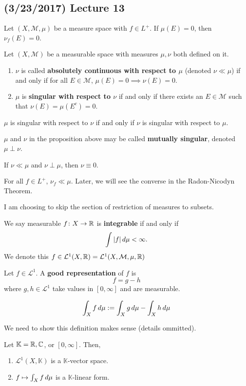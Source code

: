 \documentclass[11pt,leqno,oneside]{amsbook}
\numberwithin{thm}{section}
\newcommand{\M}{\mathcal{M}} %
\newcommand{\cL}{\mathcal{L}}
\renewcommand{\de}{\textbf} %
\begin{document}
\subsection*{(3/23/2017) Lecture 13}
\begin{prop}
  Let \((X,\M,\mu)\) be a measure space with \(f \in L^+\). If
  \(\mu(E) = 0\), then \(\nu_f(E) = 0\).
\end{prop}
\begin{defn}
  Let \((X,\M)\) be a measurable space with measures \(\mu,\nu\) both
  defined on it.
  \begin{enumerate}
  \item \(\nu\) is called \de{absolutely continuous with respect to
      \(\mu\)} (denoted \(\nu \ll \mu\)) if and only if for all \(E
    \in \M\), \(\mu(E) = 0 \implies \nu(E) = 0\).
  \item \(\mu\) is \de{singular with respect to \(\nu\)} if and only
    if there exists an \(E \in \M\) such that \(\nu(E) = \mu(E^c) =
    0\).
  \end{enumerate}
\end{defn}
\begin{prop}
  \(\mu\) is singular with respect to \(\nu\) if and only if \(\nu\)
  is singular with respect to \(\mu\).
\end{prop}
\begin{defn}
  \(\mu\) and \(\nu\) in the proposition above may be called
  \de{mutually singular}, denoted \(\mu \perp \nu\).
\end{defn}
\begin{rmk}
  If \(\nu \ll \mu\) and \(\nu \perp \mu\), then \(\nu \equiv 0\).
\end{rmk}
\begin{rmk}
  For all \(f \in L^+\), \(\nu_f \ll \mu\). Later, we will see the
  converse in the Radon-Nicodyn Theorem.
\end{rmk}
I am choosing to skip the section of restriction of measures to
subsets.
\begin{defn}
  We say measurable \(f \colon X \to {\mathbb R}\) is \de{integrable} if and only if \[
    \int |f| \, d\mu < \infty.
  \]
  We denote this \(f \in \cL^1(X,\R) = \cL^1(X,\M,\mu,\R)\)
\end{defn}
\begin{defn}
  Let \(f \in \cL^1\). A \de{good representation} of \(f\) is \[
    f = g-h
  \]
  where \(g,h \in \cL^1\) take values in \([0,\infty]\) and are
  measurable.
\end{defn}
\begin{defn}
  \[
    \int_X f \, d\mu := \int_X g \, d\mu - \int_X h \, d\mu
  \]
\end{defn}
We need to show this definition makes sense (details ommitted).
\begin{prop}
  Let \(\mathbb{K} = {\mathbb R},{\mathbb C}\), or \([0,\infty]\). Then,
  \begin{enumerate}
  \item \(\cL^1(X,\mathbb{K})\) is a \(\mathbb{K}\)-vector space.
  \item \(f \mapsto \int_X f \, d\mu\) is a \(\mathbb{K}\)-linear form.
  \end{enumerate}
\end{prop}
\end{document}

